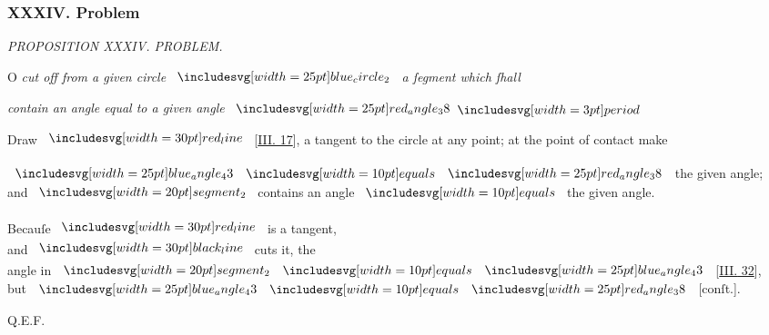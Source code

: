 \documentclass[11pt,preview]{standalone}
\begin{document}
\subsubsection{XXXIV. Problem}

\begin{minipage}[t]{0.43\textwidth}
    \vspace{20pt}
    
\end{minipage}%
\hfill
\begin{minipage}[t]{0.54\textwidth}
    \begin{center}
        \textit{PROPOSITION XXXIV. PROBLEM.}\label{book3pr34} \\
    \end{center}

    \hfill

    \begin{center}
        \raggedright \lettrine[lines=3, loversize=1, nindent=0pt]{}{}O \textit{cut off from a given circle} $\img{blue_circle_2}$ \textit{a ſegment which ſhall}
    \end{center}
    \textit{contain an angle equal to a given angle} $\img{red_angle_38} \bperiod$
\end{minipage}%

\hfill

\hfill

\raggedright Draw $\redline$ [\hyperref[book3pr17]{\textsc{III.} 17}], a tangent to the circle at any point; at the point of contact make

\hfill

\begin{center}
    $\img{blue_angle_43} \bequals \img{red_angle_38}$ the given angle;\\
    and $\img[0][0][20]{segment_2}$ contains an angle $\bequals$ the given angle.\\
    \hfill\\
    Becauſe $\redline$ is a tangent,\\
    and $\blackline$ cuts it, the\\
    angle in $\img[0][0][20]{segment_2} \bequals \img{blue_angle_43}$ [\hyperref[book3pr22]{\textsc{III.} 32}],\\
    but $\img{blue_angle_43} \bequals \img{red_angle_38}$ [conſt.].
\end{center}

\hfill

\hfill Q.E.F.
\end{document}
